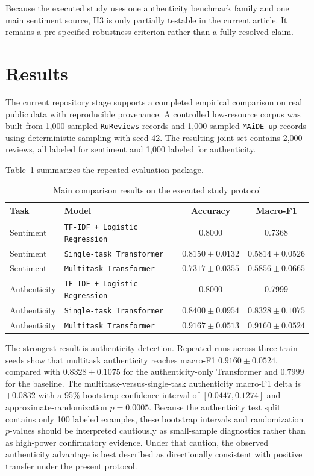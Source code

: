 \documentclass[12pt,a4paper]{article}
\begin{document}
Because the executed study uses one authenticity benchmark family and one main sentiment source, H3 is only partially testable in the current article. It remains a pre-specified robustness criterion rather than a fully resolved claim.

\section{Results}

The current repository stage supports a completed empirical comparison on real public data with reproducible provenance. A controlled low-resource corpus was built from 1{,}000 sampled \texttt{RuReviews} records and 1{,}000 sampled \texttt{MAiDE-up} records using deterministic sampling with seed 42. The resulting joint set contains 2{,}000 reviews, all labeled for sentiment and 1{,}000 labeled for authenticity.

Table~\ref{tab:mainresults} summarizes the repeated evaluation package.

\begin{table}[h]
\centering
\caption{Main comparison results on the executed study protocol}
\label{tab:mainresults}
\begin{tabular}{llcc}
\toprule
Task & Model & Accuracy & Macro-F1 \\
\midrule
Sentiment & \texttt{TF-IDF + Logistic Regression} & 0.8000 & 0.7368 \\
Sentiment & \texttt{Single-task Transformer} & $0.8150 \pm 0.0132$ & $0.5814 \pm 0.0526$ \\
Sentiment & \texttt{Multitask Transformer} & $0.7317 \pm 0.0355$ & $0.5856 \pm 0.0665$ \\
Authenticity & \texttt{TF-IDF + Logistic Regression} & 0.8000 & 0.7999 \\
Authenticity & \texttt{Single-task Transformer} & $0.8400 \pm 0.0954$ & $0.8328 \pm 0.1075$ \\
Authenticity & \texttt{Multitask Transformer} & $0.9167 \pm 0.0513$ & $0.9160 \pm 0.0524$ \\
\bottomrule
\end{tabular}
\end{table}

The strongest result is authenticity detection. Repeated runs across three train seeds show that multitask authenticity reaches macro-F1 $0.9160 \pm 0.0524$, compared with $0.8328 \pm 0.1075$ for the authenticity-only Transformer and $0.7999$ for the baseline. The multitask-versus-single-task authenticity macro-F1 delta is $+0.0832$ with a 95\% bootstrap confidence interval of $[0.0447, 0.1274]$ and approximate-randomization $p=0.0005$. Because the authenticity test split contains only 100 labeled examples, these bootstrap intervals and randomization $p$-values should be interpreted cautiously as small-sample diagnostics rather than as high-power confirmatory evidence. Under that caution, the observed authenticity advantage is best described as directionally consistent with positive transfer under the present protocol.
\end{document}
